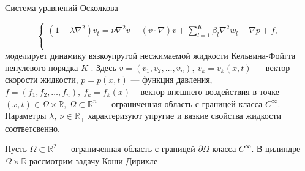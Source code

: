 Система уравнений Осколкова

\begin{equation}
\left \{
\begin{array}{l}
(1- \lambda {\nabla}^2)v_{t}=\nu\nabla^{2}v-(v\cdot\nabla)v+\displaystyle\sum_{l=1}^K \beta_{l}\nabla^{2} w_{l}-\nabla p+f,  \\
\mathop{\mathop{0=\nabla  \cdot { v},\quad}\limits^{\ }}
\limits^{\ }\\
   {\displaystyle\mathop{\mathop{\dfrac{\partial w_{l}}{\partial t}=v+\alpha_{l}w_{l},~ \alpha_{l}\in {\mathbb{R_-}},~ \beta_{l}\in {\mathbb{R_+}},~ l=\overline{1,~K}
\quad}\limits^{\ }}\limits^{\ }}
\end{array} \right.
\end{equation}%
моделирует динамику вязкоупругой несжимаемой жидкости Кельвина-Фойгта ненулевого порядка $ K $ \cite{rrr1}. Здесь $ v=(v_{1}, v_{2},\ldots ,v_{n}),~ v_{k}=v_{k}(x,t) $ --- вектор скорости жидкости, $p=p(x,t)$ --- функция давления, $ f=(f_{1},f_{2},\ldots ,f_{n}),~ f_{k}=f_{k}(x) $ -- вектор внешнего воздействия в точке $ (x,t)\in\Omega\times {\mathbb{R}},~ \Omega\subset {\mathbb{R}}^{n}$ --- ограниченная область с границей класса $ C^{\infty}. $ Параметры $ \lambda,~ \nu \in {\mathbb{R_+}} $ характеризуют упругие и вязкие свойства жидкости соответсвенно.

 
Пусть $ \Omega\subset {\mathbb{R}}^{2} $ --- ограниченная область с границей $ \partial\Omega $ класса $ C^{\infty} $. В цилиндре $ \Omega\times {\mathbb{R}} $ рассмотрим задачу Коши-Дирихле

